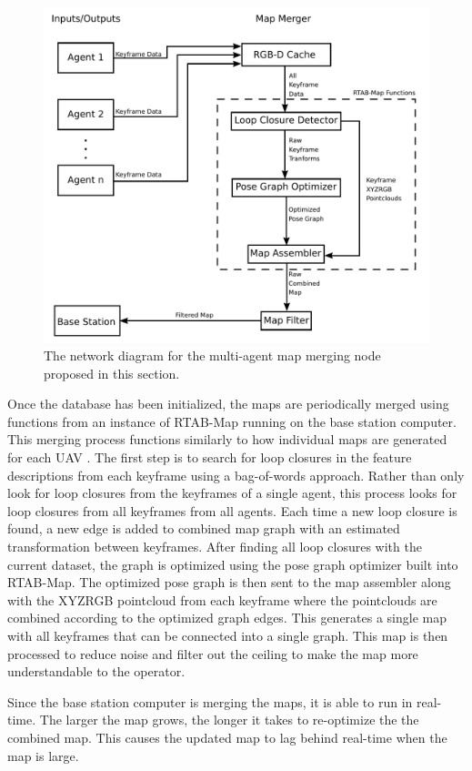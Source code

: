 \documentclass[letterpaper, 10 pt, conference]{ieeeconf}  %
\begin{document}
\begin{figure}
\centering
\includegraphics[width=0.7\linewidth]{map_merger_network}
\caption{The network diagram for the multi-agent map merging node proposed in this section.}
\label{fig:map_merge}
\end{figure}

Once the database has been initialized, the maps are periodically merged using functions from an instance of RTAB-Map running on the base station computer. This merging process functions similarly to how individual maps are generated for each UAV \cite{Labbe2011}\cite{Labbe2013}\cite{Labbe2019}. The first step is to search for loop closures in the feature descriptions from each keyframe using a bag-of-words approach. Rather than only look for loop closures from the keyframes of a single agent, this process looks for loop closures from all keyframes from all agents. Each time a new loop closure is found, a new edge is added to combined map graph with an estimated transformation between keyframes. After finding all loop closures with the current dataset, the graph is optimized using the pose graph optimizer built into RTAB-Map. The optimized pose graph is then sent to the map assembler along with the XYZRGB pointcloud from each keyframe where the pointclouds are combined according to the optimized graph edges. This generates a single map with all keyframes that can be connected into a single graph. This map is then processed to reduce noise and filter out the ceiling to make the map more understandable to the operator.

Since the base station computer is merging the maps, it is able to run in real-time. The larger the map grows, the longer it takes to re-optimize the the combined map. This causes the updated map to lag behind real-time when the map is large.
\end{document}

